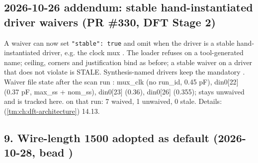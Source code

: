 \subsection{2026-10-26 addendum: stable hand-instantiated driver waivers
(PR \#330, DFT Stage 2)}\label{cr:defect:sky130-slew-cap-e45j:2026-10-26-addendum-stable-hand-instantiated-driver-waivers-pr-330-dft-stage-2}

\begin{record}

A  waiver can now set \texttt{"stable":\allowbreak{}\ true}
and omit  when the driver is a stable hand-instantiated
driver, e.g. the clock mux . The
loader refuses  on a tool-generated name; ceiling, corners
and justification bind as before; a stable waiver on a driver that does
not violate is STALE. Synthesis-named drivers keep the mandatory
. Waiver file state after the scan run
: mux\_clk (no run\_id, 0.45 pF),
din0{[}22{]} (0.37 pF, max\_ss + nom\_ss), din0{[}23{]} (0.36),
din0{[}26{]} (0.355);  stays unwaived and is tracked
here.  on that run: 7 waived, 1 unwaived, 0 stale.
Details:  (\cref{tm:ch:dft-architecture}) 14.13.

\end{record}

\subsection{\texorpdfstring{9. Wire-length 1500 adopted as default
(2026-10-28, bead
)}{9. Wire-length 1500 adopted as default (2026-10-28, bead )}}\label{cr:defect:sky130-slew-cap-e45j:9-wire-length-1500-adopted-as-default-2026-10-28-bead-e45j}

